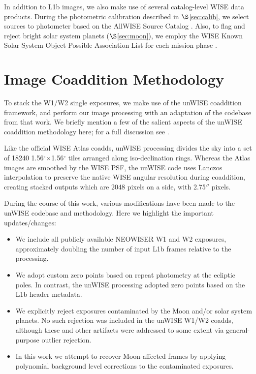 \documentclass{emulateapj}
\begin{document}
In addition to L1b images, we also make use of several catalog-level WISE
data products. During the photometric calibration described in 
$\S$\ref{sec:calib}, we select sources to photometer based on the AllWISE 
Source Catalog \citep{cutri13}. Also, to flag and reject bright solar system 
planets ($\S$\ref{sec:moon}), we employ the WISE Known Solar System Object
Possible Association List for each mission phase 
\citep{cutri12, cutri13,cutri15}.

\section{Image Coaddition Methodology}
\label{sec:coadd}

To stack the W1/W2 single exposures, we make use of the \cite{lang14}
unWISE coaddition framework, and perform our image processing with an 
adaptation of the codebase from that work. We briefly mention
a few of the salient aspects of the unWISE coaddition methodology here; for
a full discussion see \cite{lang14}.

Like the official WISE Atlas coadds, unWISE processing divides the sky
into a set of 18240 1.56$^{\circ}$$\times$1.56$^{\circ}$ tiles
arranged along iso-declination rings. Whereas the Atlas images
are smoothed by the WISE PSF, the unWISE code uses Lanczos interpolation to 
preserve the native WISE angular resolution during coaddition, creating stacked
outputs which are 2048 pixels on a side, with 2.75$''$ pixels.

During the course of this work, various modifications have been made to the
 unWISE codebase and methodology. Here we highlight the important 
updates/changes:

\begin{itemize}
\item We include all publicly available NEOWISER W1 and W2 exposures, 
approximately doubling the number of input L1b frames relative to the 
\cite{lang14} processing.
\item We adopt custom zero points based on repeat photometry at the ecliptic 
poles. In contrast, the \cite{lang14} unWISE processing adopted zero points 
based on the L1b header metadata.
\item We explicitly reject exposures contaminated by the Moon and/or solar 
system planets. No such rejection was included in the \cite{lang14} unWISE 
W1/W2 coadds, although these and other artifacts were addressed to some extent 
via general-purpose outlier rejection.
\item In this work we attempt to recover Moon-affected frames by applying 
polynomial background level corrections to the contaminated exposures.
\end{itemize}
\end{document}
